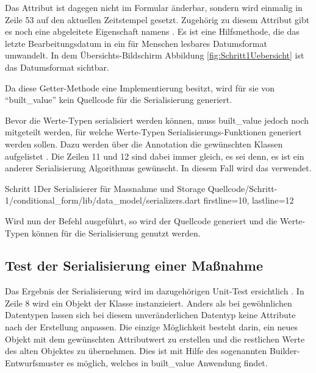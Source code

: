 Das Attribut  ist dagegen nicht im Formular änderbar, sondern wird einmalig in Zeile 53 auf den aktuellen Zeitstempel gesetzt.
Zugehörig zu diesem Attribut gibt es noch eine abgeleitete Eigenschaft namens  .  Es ist eine Hilfsmethode, die das letzte Bearbeitungsdatum in ein für Menschen lesbares Datumsformat umwandelt. In dem Übersichts-Bildschirm Abbildung \ref{fig:Schritt1Uebersicht} ist das Datumsformat sichtbar.

Da diese Getter-Methode eine Implementierung besitzt, wird für sie von \enquote{built_value} kein Quellcode für die Serialisierung generiert.

Bevor die Werte-Typen serialisiert werden können, muss built_value jedoch noch mitgeteilt werden, für welche Werte-Typen Serialisierungs-Funktionen generiert werden sollen.
Dazu werden über die Annotation  die gewünschten Klassen aufgelistet .
Die Zeilen 11 und 12 sind dabei immer gleich, es sei denn, es ist ein anderer Serialisierung Algorithmus gewünscht.
In diesem Fall wird das verwendet.

\begin{alexlisting}{Schritt 1}{Der Serialisierer für Massnahme und Storage}
  {Quellcode/Schritt-1/conditional_form/lib/data_model/serializers.dart}
  {firstline=10, lastline=12}
  \label{lst:Schritt1Serialisierer}
\end{alexlisting}


Wird nun der Befehl   ausgeführt, so wird der Quellcode generiert und die Werte-Typen können für die Serialisierung genutzt werden.

\subsection{Test der Serialisierung einer Maßnahme}

Das Ergebnis der Serialisierung wird im dazugehörigen Unit-Test ersichtlich \Lst{\ref{lst:SerialisierungEinerMassnahmeUnittest}}.
In Zeile 8 wird ein Objekt der Klasse  instanzieiert.
Anders als bei gewöhnlichen Datentypen lassen sich bei diesem unveränderlichen Datentyp keine Attribute nach der Erstellung anpassen.
Die einzige Möglichkeit besteht darin, ein neues Objekt  mit dem gewünschten Attributwert zu erstellen und die restlichen Werte des alten Objektes zu übernehmen.
Dies ist mit Hilfe des sogenannten Builder-Entwurfsmuster es möglich, welches in built_value Anwendung findet.

